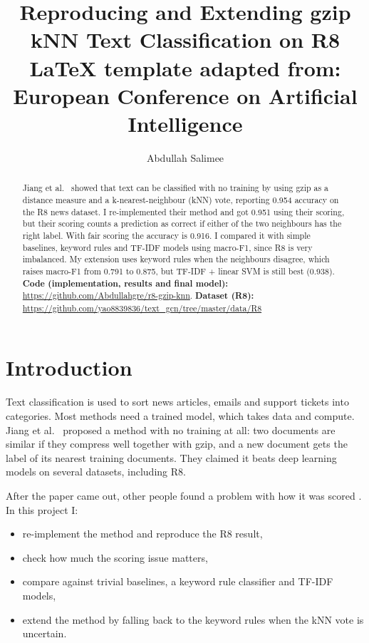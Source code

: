 \documentclass{COMPXXXX}
\begin{document}
\title{Reproducing and Extending gzip kNN Text Classification on R8 \\[12pt]
	\small \LaTeX \hspace{1mm} template adapted from: \\
	European Conference on Artificial Intelligence}

\author{Abdullah Salimee}

\maketitle


\begin{abstract}
Jiang et al.\ \cite{jiang2023} showed that text can be classified with no training by using gzip as a distance measure and a k-nearest-neighbour (kNN) vote, reporting 0.954 accuracy on the R8 news dataset. I re-implemented their method and got 0.951 using their scoring, but their scoring counts a prediction as correct if either of the two neighbours has the right label. With fair scoring the accuracy is 0.916. I compared it with simple baselines, keyword rules and TF-IDF models using macro-F1, since R8 is very imbalanced. My extension uses keyword rules when the neighbours disagree, which raises macro-F1 from 0.791 to 0.875, but TF-IDF + linear SVM is still best (0.938). \textbf{Code (implementation, results and final model):} \url{https://github.com/Abdullahgre/r8-gzip-knn}. \textbf{Dataset (R8):} \url{https://github.com/yao8839836/text_gcn/tree/master/data/R8}
\end{abstract}

\section{Introduction}
Text classification is used to sort news articles, emails and support tickets into categories. Most methods need a trained model, which takes data and compute. Jiang et al.\ \cite{jiang2023} proposed a method with no training at all: two documents are similar if they compress well together with gzip, and a new document gets the label of its nearest training documents. They claimed it beats deep learning models on several datasets, including R8.

After the paper came out, other people found a problem with how it was scored \cite{schutte2023,opitz2023}. In this project I:
\begin{itemize}
\item re-implement the method and reproduce the R8 result,
\item check how much the scoring issue matters,
\item compare against trivial baselines, a keyword rule classifier and TF-IDF models,
\item extend the method by falling back to the keyword rules when the kNN vote is uncertain.
\end{itemize}
\end{document}
